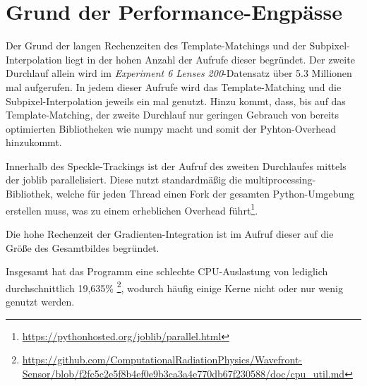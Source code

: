 \section{Grund der Performance-Engpässe}

Der Grund der langen Rechenzeiten des Template-Matchings und der Subpixel-Interpolation liegt in der hohen Anzahl der Aufrufe dieser begründet. Der zweite Durchlauf allein wird im \textit{Experiment 6 Lenses 200}-Datensatz über 5.3 Millionen mal aufgerufen. In jedem dieser Aufrufe wird das Template-Matching und die Subpixel-Interpolation jeweils ein mal genutzt. Hinzu kommt, dass, bis auf das Template-Matching, der zweite Durchlauf nur geringen Gebrauch von bereits optimierten Bibliotheken wie numpy macht und somit der Pyhton-Overhead hinzukommt. 

Innerhalb des Speckle-Trackings ist der Aufruf des zweiten Durchlaufes mittels der joblib parallelisiert. Diese nutzt standardmäßig die multiprocessing-Bibliothek, welche für jeden Thread einen Fork der gesamten Python-Umgebung erstellen muss, was zu einem erheblichen Overhead führt\footnote{\url{https://pythonhosted.org/joblib/parallel.html}}.

Die hohe Rechenzeit der Gradienten-Integration ist im Aufruf dieser auf die Größe des Gesamtbildes begründet.

Insgesamt hat das Programm eine schlechte CPU-Auslastung von lediglich durchschnittlich 19,635\% \footnote{\url{https://github.com/ComputationalRadiationPhysics/Wavefront-Sensor/blob/f2fc5c2e5f8b4ef0e9b3ca3a4e770db67f230588/doc/cpu_util.md}}, wodurch häufig einige Kerne nicht oder nur wenig genutzt werden. 
